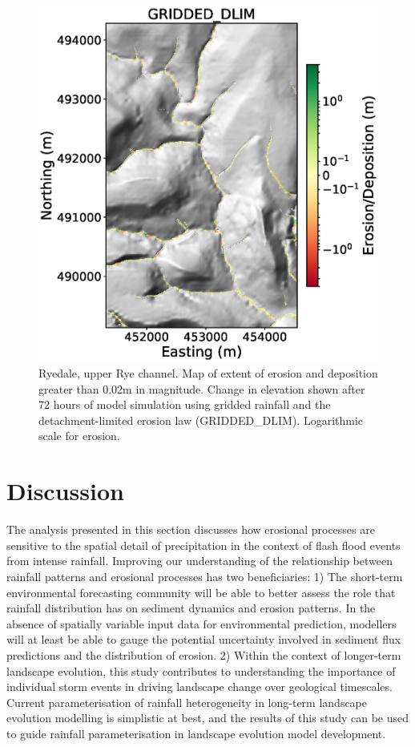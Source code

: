 \begin{figure}[htb]
\includegraphics[width=16cm]{chp06_figures_scripts/figure_ryedale_elev_diff_grid_dlim_UPPER.eps}
\caption{Ryedale, upper Rye channel. Map of extent of erosion and deposition greater than 0.02m in magnitude. Change in elevation shown after 72 hours of model simulation using gridded rainfall and the detachment-limited erosion law (GRIDDED\_DLIM). Logarithmic scale for erosion.}
\label{fig_ryedale_erodediff_UPPER_gridded_dlim}
\end{figure}

\section{Discussion}

The analysis presented in this section discusses how erosional processes are sensitive to the spatial detail of precipitation in the context of flash flood events from intense rainfall. Improving our understanding of the relationship between rainfall patterns and erosional processes has two beneficiaries: 1) The short-term environmental forecasting community will be able to better assess the role that  rainfall distribution has on sediment dynamics and erosion patterns. In the absence of spatially variable input data for environmental prediction, modellers will at least be able to gauge the potential uncertainty involved in sediment flux predictions and the distribution of erosion. 2) Within the context of longer-term landscape evolution, this study contributes to understanding the importance of individual storm events in driving landscape change over geological timescales. Current parameterisation of rainfall heterogeneity in long-term landscape evolution modelling is simplistic at best, and the results of this study can be used to guide rainfall parameterisation in landscape evolution model development. 

